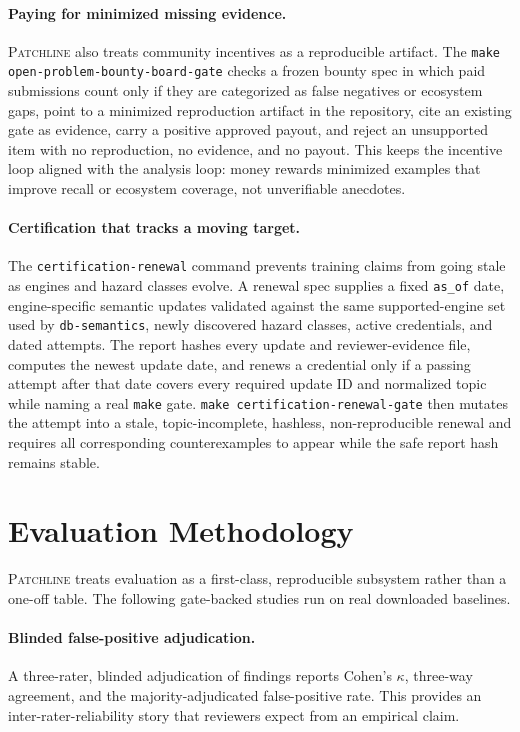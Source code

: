 \documentclass[11pt]{article}
\newcommand{\tool}{\textsc{Patchline}}
\newcommand{\code}[1]{\texttt{#1}}
\newcommand{\gate}[1]{\texttt{make #1}}
\begin{document}
\paragraph{Paying for minimized missing evidence.} \tool{} also treats community incentives as a
reproducible artifact. The \gate{open-problem-bounty-board-gate} checks a frozen bounty spec in which
paid submissions count only if they are categorized as false negatives or ecosystem gaps, point to a
minimized reproduction artifact in the repository, cite an existing gate as evidence, carry a positive
approved payout, and reject an unsupported item with no reproduction, no evidence, and no payout. This
keeps the incentive loop aligned with the analysis loop: money rewards minimized examples that improve
recall or ecosystem coverage, not unverifiable anecdotes.

\paragraph{Certification that tracks a moving target.} The \code{certification-renewal} command prevents
training claims from going stale as engines and hazard classes evolve. A renewal spec supplies a fixed
\code{as\_of} date, engine-specific semantic updates validated against the same supported-engine set used
by \code{db-semantics}, newly discovered hazard classes, active credentials, and dated attempts. The
report hashes every update and reviewer-evidence file, computes the newest update date, and renews a
credential only if a passing attempt after that date covers every required update ID and normalized topic
while naming a real \code{make} gate. \gate{certification-renewal-gate} then mutates the attempt into a
stale, topic-incomplete, hashless, non-reproducible renewal and requires all corresponding
counterexamples to appear while the safe report hash remains stable.

\section{Evaluation Methodology}
\label{sec:eval}

\tool{} treats evaluation as a first-class, reproducible subsystem rather than a one-off table. The
following gate-backed studies run on real downloaded baselines.

\paragraph{Blinded false-positive adjudication.} A three-rater, blinded adjudication of findings
reports Cohen's $\kappa$, three-way agreement, and the majority-adjudicated false-positive rate. This
provides an inter-rater-reliability story that reviewers expect from an empirical claim.
\end{document}

